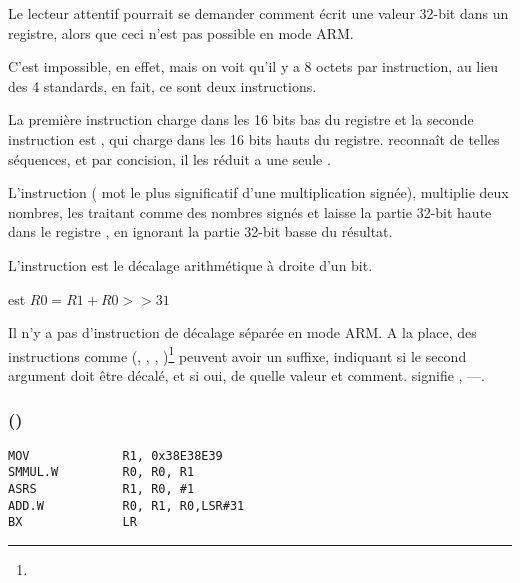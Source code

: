 
Le lecteur attentif pourrait se demander comment \MOV écrit une valeur 32-bit dans
un registre, alors que ceci n'est pas possible en mode ARM.

C'est impossible, en effet, mais on voit qu'il y a 8 octets par instruction, au lieu
des 4 standards, en fait, ce sont deux instructions.

La première instruction charge  dans les 16 bits bas du registre et la
seconde instruction est , qui charge  dans les 16 bits hauts
du registre.
\IDA reconnaît de telles séquences, et par concision, il les réduit a une seule
.

L'instruction  ( mot le plus
significatif d'une multiplication signée), multiplie deux nombres, les traitant comme
des nombres signés et laisse la partie 32-bit haute dans le registre ,
en ignorant la partie 32-bit basse du résultat.

L'instruction  est le décalage arithmétique à droite d'un bit.

 est $R0=R1 + R0>>31$

\label{shifts_in_ARM_mode}

Il n'y a pas d'instruction de décalage séparée en mode ARM.
A la place, des instructions comme
(\MOV, \ADD, \SUB, )\footnote{\DataProcessingInstructionsFootNote}
peuvent avoir un suffixe, indiquant si le second argument doit être décalé, et si
oui, de quelle valeur et comment.
 signifie , ---.


\subsubsection{\OptimizingXcodeIV (\ThumbTwoMode)}

\begin{lstlisting}[style=customasmARM]
MOV             R1, 0x38E38E39
SMMUL.W         R0, R0, R1
ASRS            R1, R0, #1
ADD.W           R0, R1, R0,LSR#31
BX              LR
\end{lstlisting}


